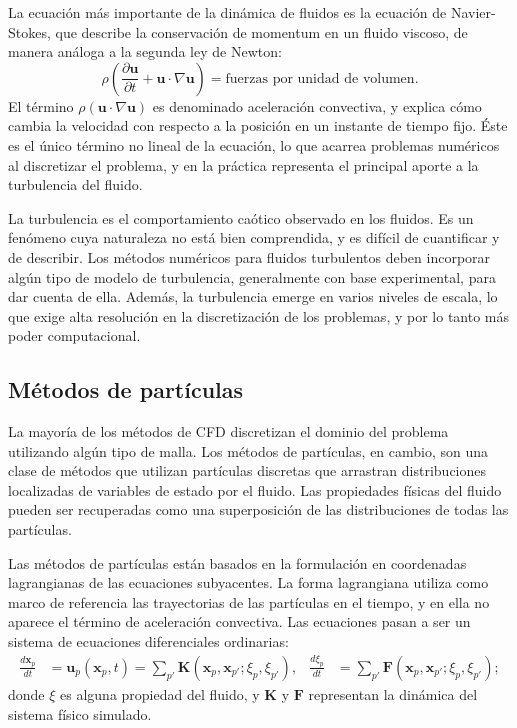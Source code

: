 \documentclass[11pt,spanish]{article}
\newcommand{\vel}{\mathbf{u}}
\newcommand{\pos}{\mathbf{x}}
\begin{document}
La ecuación más importante de la dinámica de fluidos es la ecuación de
Navier-Stokes, que describe la conservación de momentum en un fluido viscoso,
de manera análoga a la segunda ley de Newton:
\begin{equation}
    \rho\left(\frac{\partial\vel}{\partial t} + \vel\cdot\nabla\vel \right) =
    \text{fuerzas por unidad de volumen}.
\end{equation}
El término $\rho(\vel\cdot\nabla\vel)$ es denominado aceleración convectiva, y
explica cómo cambia la velocidad con respecto a la posición en un instante de
tiempo fijo.  Éste es el único término no lineal de la ecuación, lo que acarrea
problemas numéricos al discretizar el problema, y en la práctica representa el
principal aporte a la turbulencia del fluido.

La turbulencia es el comportamiento caótico observado en los fluidos.  Es un
fenómeno cuya naturaleza no está bien comprendida, y es difícil de cuantificar y
de describir.  Los métodos numéricos para fluidos turbulentos deben incorporar
algún tipo de modelo de turbulencia, generalmente con base experimental, para
dar cuenta de ella.  Además, la turbulencia emerge en varios niveles de escala,
lo que exige alta resolución en la discretización de los problemas, y por lo
tanto más poder computacional.

\subsection{Métodos de partículas}
La mayoría de los métodos de CFD discretizan el dominio del problema utilizando
algún tipo de malla.  Los métodos de partículas, en cambio, son una clase
de métodos que utilizan partículas discretas que arrastran distribuciones
localizadas de variables de estado por el fluido.  Las propiedades físicas del
fluido pueden ser recuperadas como una superposición de las distribuciones
de todas las partículas.

Las métodos de partículas están basados en la formulación en coordenadas
lagrangianas de las ecuaciones subyacentes.  La forma lagrangiana utiliza como
marco de referencia las trayectorias de las partículas en el tiempo, y en ella
no aparece el término de aceleración convectiva.  Las ecuaciones pasan a ser un
sistema de ecuaciones diferenciales ordinarias:
\begin{align}
    \frac{d\pos_p}{dt} &= \vel_p(\pos_p, t) =
        \sum_{p'} \mathbf{K}(\pos_p, \pos_{p'}; \xi_p, \xi_{p'}), &
    \frac{d\xi_p}{dt} &=
        \sum_{p'} \mathbf{F}(\pos_p, \pos_{p'}; \xi_p, \xi_{p'});
\end{align}
donde $\xi$ es alguna propiedad del fluido, y $\mathbf{K}$ y $\mathbf{F}$
representan la dinámica del sistema físico simulado.
\end{document}
